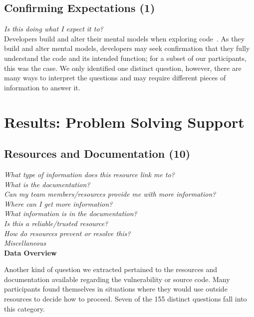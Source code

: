 \documentclass[conference]{IEEEtran}
\begin{document}

\noindent\subsection{\textbf{Confirming Expectations (1)}}\label{ce}

\noindent\emph{Is this doing what I expect it to?} \\
Developers build and alter their mental models when exploring code~\cite{canas1994mental, burkhardt1997mental}. 
As they build and alter mental models, developers may seek confirmation that they fully understand the code and its intended function; for a subset of our participants, this was the case. 
We only identified one distinct question, however, there are many ways to interpret the questions and may require different pieces of information to answer it.



\section{Results: Problem Solving Support}
\label{sec:results-pss}



\noindent\subsection{\textbf{Resources and Documentation (10)}}\label{rd}

\noindent\emph{What type of information does this resource link me to?} \\
\emph{What is the documentation?} \\
\emph{Can my team members/resources provide me with more information?} \\
\emph{Where can I get more information?} \\
\emph{What information is in the documentation?} \\
\emph{Is this a reliable/trusted resource?} \\
\emph{How do resources prevent or resolve this?} \\
\emph{Miscellaneous} \\


\noindent\textbf{Data Overview}


Another kind of question we extracted pertained to the resources and documentation available regarding the vulnerability or source code. 
Many participants found themselves in situations where they would use outside resources to decide how to proceed. 
Seven of the 155 distinct questions fall into this category. 
\\
\end{document}
